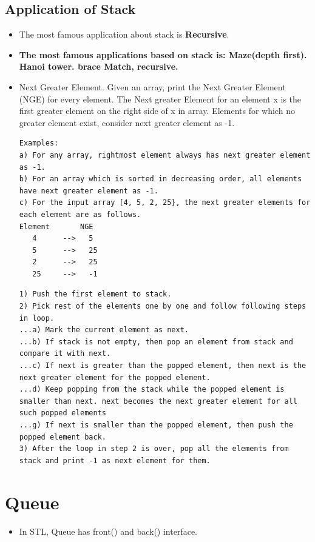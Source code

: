\documentclass[a4paper,12pt,twoside]{book}
\begin{document}
\subsection{Application of Stack}
\begin{itemize}
\item The most famous application about stack is \textbf{Recursive}.
\item \textbf{The most famous applications based on stack is:  Maze(depth first). Hanoi tower. brace Match, recursive.}  

\item Next Greater Element.  Given an array, print the Next Greater Element (NGE) for every element. The Next greater Element for an element x is the first greater element on the right side of x in array. Elements for which no greater element exist, consider next greater element as -1.
\begin{verbatim}
Examples:
a) For any array, rightmost element always has next greater element as -1.
b) For an array which is sorted in decreasing order, all elements have next greater element as -1.
c) For the input array [4, 5, 2, 25}, the next greater elements for each element are as follows.
Element       NGE
   4      -->   5
   5      -->   25
   2      -->   25
   25     -->   -1
\end{verbatim}

\begin{lstlisting}[breaklines]
1) Push the first element to stack.
2) Pick rest of the elements one by one and follow following steps in loop.
...a) Mark the current element as next.
...b) If stack is not empty, then pop an element from stack and compare it with next.
...c) If next is greater than the popped element, then next is the next greater element for the popped element.
...d) Keep popping from the stack while the popped element is smaller than next. next becomes the next greater element for all such popped elements
...g) If next is smaller than the popped element, then push the popped element back.
3) After the loop in step 2 is over, pop all the elements from stack and print -1 as next element for them.
\end{lstlisting}

\end{itemize}


\section{Queue}
\begin{itemize}
\item In STL, Queue has front() and back() interface. 

\end{itemize}
\end{document}
